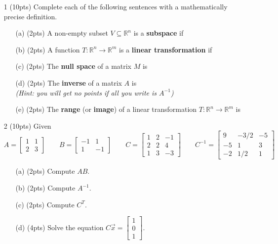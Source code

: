 \documentclass{article}
\newcommand{\R}{\mathbb{R}}
\newcommand{\mat}[1]{\begin{bmatrix}#1\end{bmatrix}}
\begin{document}
\begin{enumerate}
	\item[1 (10pts)] Complete each of the following sentences with a mathematically precise definition.
	\begin{enumerate}
		\item[(a) (2pts)] A non-empty subset $V\subseteq \R^n$ is a {\bf subspace} if
		\vspace{1.5in}
		\item[(b) (2pts)] A function $T:\R^n\to\R^m$ is a {\bf linear transformation} if
		\vspace{1.5in}
		\item[(c) (2pts)] The {\bf null space} of a matrix $M$ is
		\vspace{1.5in}
		\item[(d) (2pts)] The {\bf inverse} of a matrix $A$ is \\ {\it(Hint: you will get no points if all you write is $A^{-1}$)}
		\vspace{1.5in}
		\item[(e) (2pts)] The {\bf range} (or {\bf image}) of a linear transformation $T:\R^n\to\R^m$ is
		\vspace{1in}
		
	
		\vspace{5in}
	\end{enumerate}
	\clearpage

	\item[2 (10pts)] Given
		\[
			A=\mat{1&1\\2&3}\qquad
			B=\mat{-1&1\\1&-1}\qquad
			C=\mat{1&2&-1\\2&2&4\\1&3&-3}\qquad
			C^{-1}=\mat{9&-3/2&-5\\-5&1&3\\-2&1/2&1}
		\]
	\begin{enumerate}
		\item[(a) (2pts)] Compute $AB$.
			\vspace{1.5in}
		\item[(b) (2pts)] Compute $A^{-1}$.
			\vspace{2.5in}
		\item[(c) (2pts)] Compute $C^T$.
			\vspace{1.5in}
		\item[(d) (4pts)] Solve the equation $C\vec x=\mat{1\\0\\1}$.
			\vspace{1in}
		

\end{enumerate}
\end{enumerate}
\end{document}
